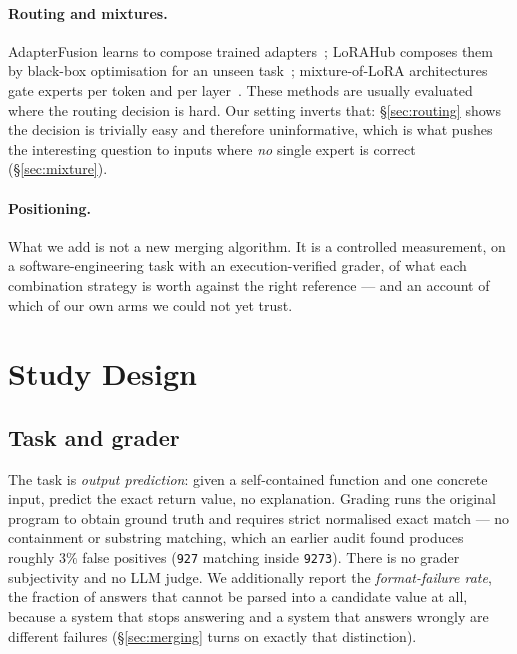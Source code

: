 \documentclass[sigconf,review,anonymous]{acmart}
\begin{document}
\paragraph{Routing and mixtures.} AdapterFusion learns to compose trained
adapters~\cite{pfeiffer2021adapterfusion}; LoRAHub composes them by black-box optimisation for
an unseen task~\cite{huang2024lorahub}; mixture-of-LoRA architectures gate experts per token
and per layer~\cite{wu2024mole,li2024mixlora}. These methods are usually evaluated where the
routing decision is hard. Our setting inverts that: \S\ref{sec:routing} shows the decision is
trivially easy and therefore uninformative, which is what pushes the interesting question to
inputs where \emph{no} single expert is correct (\S\ref{sec:mixture}).

\paragraph{Positioning.} What we add is not a new merging algorithm. It is a controlled
measurement, on a software-engineering task with an execution-verified grader, of what each
combination strategy is worth against the right reference --- and an account of which of our own
arms we could not yet trust.

\section{Study Design}
\label{sec:design}

\subsection{Task and grader}

The task is \emph{output prediction}: given a self-contained function and one concrete input,
predict the exact return value, no explanation. Grading runs the original program to obtain
ground truth and requires strict normalised exact match --- no containment or substring
matching, which an earlier audit found produces roughly $3\%$ false positives (\texttt{927}
matching inside \texttt{9273}). There is no grader subjectivity and no LLM judge. We
additionally report the \emph{format-failure rate}, the fraction of answers that cannot be
parsed into a candidate value at all, because a system that stops answering and a system that
answers wrongly are different failures (\S\ref{sec:merging} turns on exactly that distinction).
\end{document}
